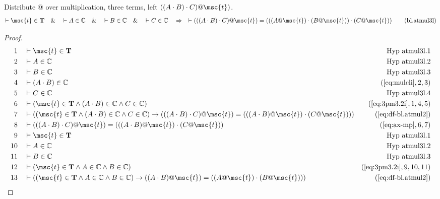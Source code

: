\begin{lemma} Distribute @ over multiplication, three
terms, left $( ( A \cdot B ) \cdot C ) @ \msc{t} )$.
\begin{align}
\vdash \msc{t} \in \mathbf{T}\quad\&\quad \vdash A \in \mathbb{C}\quad\&\quad
    \vdash B \in \mathbb{C}\quad\&\quad \vdash C \in
    \mathbb{C}\quad\Rightarrow\quad \vdash ( ( ( A \cdot B ) \cdot C ) @
    \msc{t} ) = ( ( ( A @ \msc{t} ) \cdot ( B @ \msc{t} ) ) \cdot ( C @ \msc{t}
    ) )\label{eq:bl.atmul3l}\tag{bl.atmul3l}
\end{align}
\end{lemma}

\begin{proof}
\begin{align}
  1 &&  & \vdash \msc{t} \in \mathbf{T}&\text{Hyp~atmul3l.1}\notag%
  \\ 2 &&  & \vdash A \in \mathbb{C}&\text{Hyp~atmul3l.2}\notag%
  \\ 3 &&  & \vdash B \in \mathbb{C}&\text{Hyp~atmul3l.3}\notag%
  \\ 4 &&  & \vdash ( A \cdot B ) \in \mathbb{C}&(\mbox{\ref{eq:mulcli}},2,3)\notag
  \\ 5 &&  & \vdash C \in \mathbb{C}&\text{Hyp~atmul3l.4}\notag%
  \\ 6 &&  & \vdash ( \msc{t} \in \mathbf{T} \wedge ( A \cdot B ) \in \mathbb{C} \wedge C \in \mathbb{C} )&(\mbox{\ref{eq:3pm3.2i}},1,4,5)\notag
  \\ 7 &&  & \vdash ( ( \msc{t} \in \mathbf{T} \wedge ( A \cdot B ) \in \mathbb{C} \wedge C \in \mathbb{C} ) \rightarrow ( ( ( A \cdot B ) \cdot C ) @ \msc{t} ) = ( ( ( A \cdot B ) @ \msc{t} ) \cdot ( C @ \msc{t} ) ) )&(\mbox{\ref{eq:df-bl.atmul2}})\notag
  \\ 8 &&  & \vdash ( ( ( A \cdot B ) \cdot C ) @ \msc{t} ) = ( ( ( A \cdot B ) @ \msc{t} ) \cdot ( C @ \msc{t} ) )&(\mbox{\ref{eq:ax-mp}},6,7)\notag
  \\ 9 &&  & \vdash \msc{t} \in \mathbf{T}&\text{Hyp~atmul3l.1}\notag%
  \\ 10 &&  & \vdash A \in \mathbb{C}&\text{Hyp~atmul3l.2}\notag%
  \\ 11 &&  & \vdash B \in \mathbb{C}&\text{Hyp~atmul3l.3}\notag%
  \\ 12 &&  & \vdash ( \msc{t} \in \mathbf{T} \wedge A \in \mathbb{C} \wedge B \in \mathbb{C} )&(\mbox{\ref{eq:3pm3.2i}},9,10,11)\notag
  \\ 13 &&  & \vdash ( ( \msc{t} \in \mathbf{T} \wedge A \in \mathbb{C} \wedge B \in \mathbb{C} ) \rightarrow ( ( A \cdot B ) @ \msc{t} ) = ( ( A @ \msc{t} ) \cdot ( B @ \msc{t} ) ) )&(\mbox{\ref{eq:df-bl.atmul2}})\notag

\end{align}
\end{proof}
